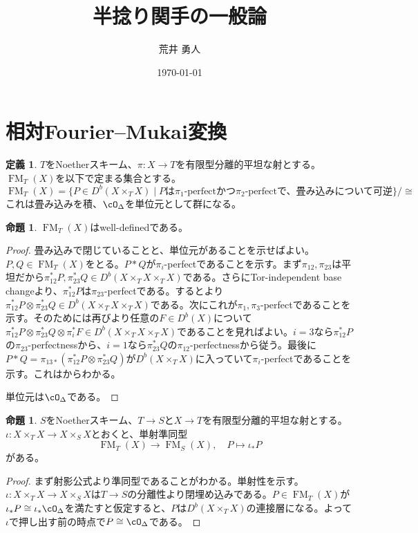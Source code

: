 \documentclass[uplatex, a4paper, dvipdfmx]{jsarticle}
\title{半捻り関手の一般論}
\author{荒井 勇人}
\date{\today}
\theoremstyle{definition}
\newtheorem{definition}[theorem]{定義}
\newtheorem{proposition}[theorem]{命題}
\DeclareMathOperator{\FM}{\mathrm{FM}}
\begin{document}
\maketitle
\section{相対Fourier--Mukai変換}
\begin{definition}
    $T$をNoetherスキーム、$\pi \colon X \to T$を有限型分離的平坦な射とする。
    $\FM_T(X)$を以下で定まる集合とする。
    \begin{equation}
        \FM_T(X) = \{P \in D^b(X \times_T X) \mid P \text{は$\pi_1$-perfectかつ$\pi_2$-perfectで、畳み込みについて可逆}\}/\cong
    \end{equation}
    これは畳み込みを積、$\cO_{\Delta}$を単位元として群になる。
\end{definition}
\begin{proposition}
    $\FM_T(X)$はwell-definedである。
\end{proposition}
\begin{proof}
    畳み込みで閉じていることと、単位元があることを示せばよい。
    $P, Q \in \FM_T(X)$をとる。$P*Q$が$\pi_i$-perfectであることを示す。まず$\pi_{12}, \pi_{23}$は平坦だから$\pi_{12}^*P, \pi_{23}^*Q \in D^b(X \times_T X \times_T X)$である。さらにTor-independent base changeより、$\pi_{12}^*P$は$\pi_{23}$-perfectである。すると\cite[Lemma 5.1]{MR3720794}より$\pi_{12}^*P \otimes \pi_{23}^*Q \in D^b(X \times_T X \times_T X)$である。次にこれが$\pi_1, \pi_3$-perfectであることを示す。そのためには再び\cite[Lemma 5.1]{MR3720794}より任意の$F \in D^b(X)$について$\pi_{12}^*P \otimes \pi_{23}^*Q \otimes \pi_i^*F \in D^b(X \times_T X \times_T X)$であることを見ればよい。$i=3$なら$\pi_{12}^*P$の$\pi_{23}$-perfectnessから、$i=1$なら$\pi_{23}^*Q$の$\pi_{12}$-perfectnessから従う。最後に$P * Q = \pi_{13*}(\pi_{12}^*P \otimes \pi_{23}^*Q)$が$D^b(X\times_T X)$に入っていて$\pi_{i}$-perfectであることを示す。これは\cite[Proposition 2.7]{MR3720794}からわかる。

    単位元は$\cO_\Delta$である。
\end{proof}




\begin{proposition}\label{prop:forget-base}
    $S$をNoetherスキーム、$T \to S$と$X \to T$を有限型分離的平坦な射とする。$\iota \colon X \times_T X \to X \times_S X$とおくと、単射準同型
    \begin{equation}
        \FM_T(X) \to \FM_{S}(X), \quad P \mapsto \iota_*P
    \end{equation}
    がある。
\end{proposition}
\begin{proof}
    まず射影公式より準同型であることがわかる。単射性を示す。
    $\iota \colon X \times_T X \to X \times_S X$は$T \to S$の分離性より閉埋め込みである。$P \in \FM_T (X)$が$\iota_*P \cong \iota_*\cO_\Delta$を満たすと仮定すると、$P$は$D^b(X \times_T X)$の連接層になる。よって$\iota$で押し出す前の時点で$P \cong \cO_\Delta$である。
\end{proof}
\end{document}
